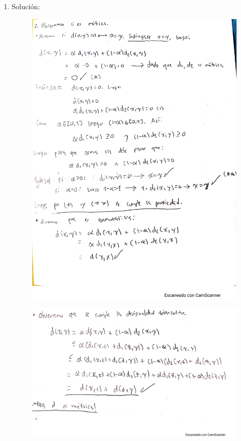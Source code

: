 \documentclass[fleqn]{article}
\begin{document}
\begin{enumerate}
  \item Solución:
    \begin{figure}[H]
      \centering \includegraphics[scale=.8]{figs/2a}
    \end{figure}
    \begin{figure}[H]
      \centering \includegraphics[scale=.5]{figs/2b}

\end{figure}
\end{enumerate}
\end{document}
